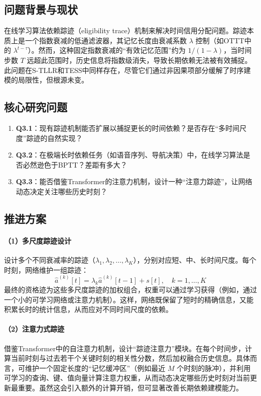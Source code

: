 \documentclass{article}
\begin{document}
\subsection{问题背景与现状}

在线学习算法依赖踪迹（eligibility trace）机制来解决时间信用分配问题。踪迹本质上是一个指数衰减的低通滤波器，其记忆长度由衰减系数 \(\lambda\) 控制（如OTTT中的 \(\lambda^{t-\tau}\)）。然而，这种固定指数衰减的“有效记忆范围”约为 \(1/(1-\lambda)\)，当时间步数 \(T\) 远超此范围时，历史信息将指数级消失，导致长期依赖无法被有效捕捉。此问题在S-TLLR和TESS中同样存在，尽管它们通过非因果项部分缓解了时序建模的局限性，但根源未变。

\subsection{核心研究问题}

\begin{enumerate}
    \item \textbf{Q3.1}：现有踪迹机制能否扩展以捕捉更长的时间依赖？是否存在“多时间尺度”踪迹的自然实现？
    \item \textbf{Q3.2}：在极端长时依赖任务（如语音序列、导航决策）中，在线学习算法是否必然逊色于BPTT？差距有多大？
    \item \textbf{Q3.3}：能否借鉴Transformer的注意力机制，设计一种“注意力踪迹”，让网络动态决定关注哪些历史时刻？
\end{enumerate}

\subsection{推进方案}

\paragraph{（1）多尺度踪迹设计}
设计多个不同衰减率的踪迹（\(\lambda_1, \lambda_2, \dots, \lambda_K\)），分别对应短、中、长时间尺度。每个时刻，网络维护一组踪迹：
\[
\hat{a}^{(k)}[t] = \lambda_k \hat{a}^{(k)}[t-1] + s[t], \quad k=1,\dots,K
\]
最终的资格迹为这些多尺度踪迹的加权组合，权重可以通过学习获得（例如，通过一个小的可学习网络或注意力机制）。这样，网络既保留了短时的精确信息，又能积累长时的统计信息，从而应对不同时间尺度的依赖。

\paragraph{（2）注意力式踪迹}
借鉴Transformer中的自注意力机制，设计“踪迹注意力”模块。在每个时间步，计算当前时刻与过去若干个关键时刻的相关性分数，然后加权融合历史信息。具体而言，可维护一个固定长度的“记忆缓冲区”（例如最近 \(M\) 个时刻的脉冲），并利用可学习的查询、键、值向量计算注意力权重，从而动态决定哪些历史时刻对当前更新最重要。虽然这会引入额外的计算开销，但可显著改善长期依赖建模能力。
\end{document}
